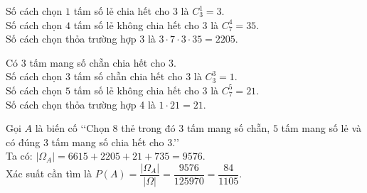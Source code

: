 \begin{vd}
{\begin{description}
			Số cách chọn $1$ tấm số lẻ chia hết cho 3 là $C_3^1=3$.\\
			Số cách chọn $4$ tấm số lẻ không chia hết cho 3 là $C_7^4=35$.\\
			Số cách chọn thỏa trường hợp 3 là $3\cdot 7\cdot 3\cdot 35=2205$.
			\item[Trường hợp 4:] Có $3$ tấm mang số chẵn chia hết cho $3$.\\
			Số cách chọn $3$ tấm số chẵn chia hết cho 3 là $C_3^3=1$.\\
			Số cách chọn $5$ tấm số lẻ không chia hết cho 3 là $C_7^5=21$.\\
			Số cách chọn thỏa trường hợp 4 là $1\cdot 21=21$.
		\end{description}
		Gọi $A$ là biến cố \lq\lq Chọn $8$ thẻ trong đó $3$ tấm mang số chẵn, $5$ tấm mang số lẻ và có đúng $3$ tấm mang số chia hết cho $3$.\rq\rq \\
		Ta có: $\left|\Omega_A\right|=6615+2205+21+735=9576$.\\
		Xác suất cần tìm là $P\left(A\right)=\dfrac{\left|\Omega_A\right|}{\left|\Omega\right|}=\dfrac{9576}{125970}=\dfrac{84}{1105}$.
	}
\end{vd}
